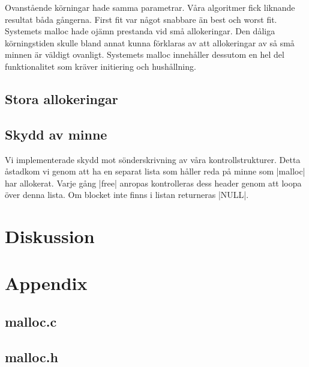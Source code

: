 \documentclass[paper=a4, fontsize=11pt]{scrartcl} %
\numberwithin{equation}{section} %
\numberwithin{figure}{section} %
\numberwithin{table}{section} %
\begin{document}
Ovanstående körningar hade samma parametrar. Våra algoritmer fick liknande resultat båda gångerna. First fit var något snabbare än best och worst fit. Systemets malloc hade ojämn prestanda vid små allokeringar. 
Den dåliga körningstiden skulle bland annat kunna förklaras av att allokeringar av så små minnen är väldigt ovanligt. Systemets malloc innehåller dessutom en hel del funktionalitet som kräver initiering och hushållning.


\subsection{Stora allokeringar}


\subsection{Skydd av minne}

Vi implementerade skydd mot sönderskrivning av våra kontrollstrukturer. 
Detta åstadkom vi genom att ha en separat lista som håller reda på minne som |malloc| har allokerat.
Varje gång |free| anropas kontrolleras dess header genom att loopa över denna lista.
Om blocket inte finns i listan returneras |NULL|.




\section{Diskussion}


\newpage
\section*{Appendix}
\subsection*{malloc.c}


\newpage
\subsection*{malloc.h}

\end{document}
